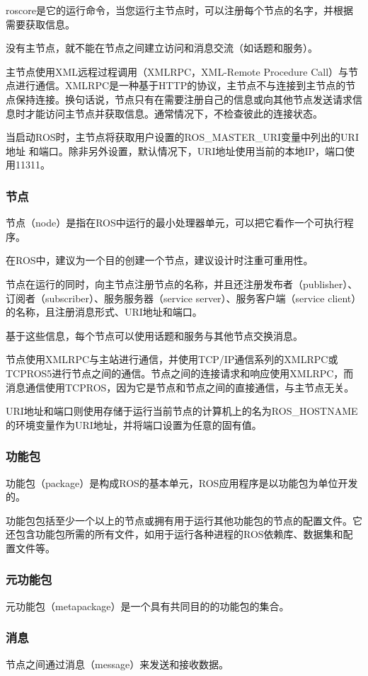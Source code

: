 \documentclass[geye,green,kindle,cn]{elegantnote}
\begin{document}
roscore是它的运行命令，当您运行主节点时，可以注册每个节点的名字，并根据需要获取信息。

没有主节点，就不能在节点之间建立访问和消息交流（如话题和服务）。

主节点使用XML远程过程调用（XMLRPC，XML-Remote Procedure Call）与节点进行通信。XMLRPC是一种基于HTTP的协议，主节点不与连接到主节点的节点保持连接。换句话说，节点只有在需要注册自己的信息或向其他节点发送请求信息时才能访问主节点并获取信息。通常情况下，不检查彼此的连接状态。

当启动ROS时，主节点将获取用户设置的ROS\_MASTER\_URI变量中列出的URI地址 和端口。除非另外设置，默认情况下，URI地址使用当前的本地IP，端口使用11311。

\subsubsection{节点}
节点（node）是指在ROS中运行的最小处理器单元，可以把它看作一个可执行程序。

在ROS中，建议为一个目的创建一个节点，建议设计时注重可重用性。

节点在运行的同时，向主节点注册节点的名称，并且还注册发布者（publisher）、 订阅者（subscriber）、服务服务器（service server）、服务客户端（service client）的名称，且注册消息形式、URI地址和端口。

基于这些信息，每个节点可以使用话题和服务与其他节点交换消息。

节点使用XMLRPC与主站进行通信，并使用TCP/IP通信系列的XMLRPC或TCPROS5进行节点之间的通信。节点之间的连接请求和响应使用XMLRPC，而消息通信使用TCPROS，因为它是节点和节点之间的直接通信，与主节点无关。

URI地址和端口则使用存储于运行当前节点的计算机上的名为ROS\_HOSTNAME的环境变量作为URI地址，并将端口设置为任意的固有值。
\subsubsection{功能包}
功能包（package）是构成ROS的基本单元，ROS应用程序是以功能包为单位开发的。

功能包包括至少一个以上的节点或拥有用于运行其他功能包的节点的配置文件。它还包含功能包所需的所有文件，如用于运行各种进程的ROS依赖库、数据集和配置文件等。
\subsubsection{元功能包}
元功能包（metapackage）是一个具有共同目的的功能包的集合。
\subsubsection{消息}
节点之间通过消息（message）来发送和接收数据。
\end{document}
